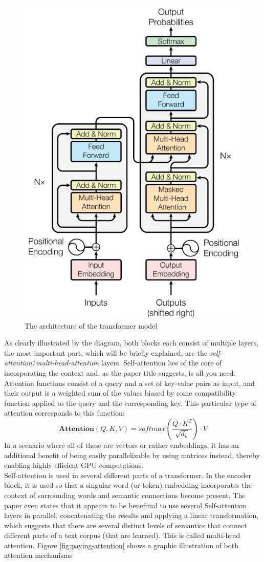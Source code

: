 \documentclass[draft,final]{vutinfth} %
\begin{document}
\begin{figure}
    \centering
    \includegraphics[width=0.5\linewidth]{thesis-figures/Transformer-Architecture.png}
    \caption{The architecture of the transformer model \cite[p. 3]{vaswani_attention_2017}}
    \label{fig:transformer-architecture}
\end{figure}As clearly illustrated by the diagram, both blocks each consist of multiple layers, the most important part, which will be briefly explained, are the \textit{self-attention}/\textit{multi-head-attention} layers. Self-attention lies of the core of incorporating the context and, as the paper title suggests, is all you need. Attention functions consist of a query and a set of key-value pairs as input, and their output is a weighted sum of the values biased by some compatibility function applied to the query and the corresponding key. This particular type of attention corresponds to this function: 
$$\mathbf{Attention}(Q,K,V) = softmax(\frac{Q \cdot K^T}{\sqrt{d_k}}) \cdot V$$
In a scenario where all of these are vectors or rather embeddings, it has an additional benefit of being easily parallelizable by using matrices instead, thereby enabling highly efficient GPU computations.\\
Self-attention is used in several different parts of a transformer. In the encoder block, it is used so that a singular word (or token) embedding incorporates the context of surrounding words and semantic connections become present. The paper even states that it appears to be benefitial to use several Self-attention layers in parallel, concatenating the results and applying a linear transformation, which suggests that there are several distinct levels of semantics that connect different parts of a text corpus (that are learned). This is called multi-head attention. Figure \ref{fig:paying-attention} shows a graphic illustration of both attention mechanisms
\end{document}
